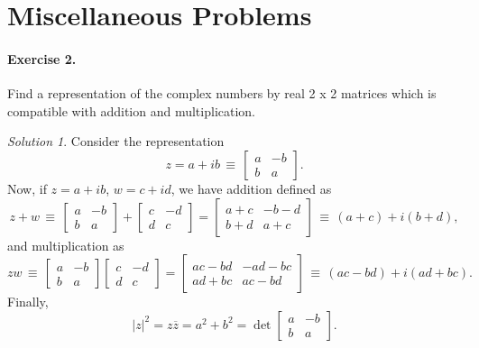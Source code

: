 \documentclass[11pt]{report}
\theoremstyle{remark}
\newtheorem*{solution}{Solution}
\begin{document}
    
    \section*{Miscellaneous Problems}

    \paragraph{Exercise 2.} Find a representation of the complex numbers by real 2 x
    2 matrices which is compatible with addition and multiplication.
    \begin{solution}
        Consider the representation \[
            z = a + ib \,\equiv\, \begin{bmatrix}
                a & -b \\ b & a
            \end{bmatrix}.
        \] Now, if $z = a + ib$, $w = c + id$, we have addition defined as \[
            z + w \,\equiv\, \begin{bmatrix}
                a & -b \\ b & a
            \end{bmatrix} + \begin{bmatrix}
                c & -d \\ d & c
            \end{bmatrix} = \begin{bmatrix}
                a + c & -b - d \\ b + d & a + c
            \end{bmatrix} \,\equiv\, (a + c) + i(b + d),
        \] and multiplication as \[
            zw \,\equiv\, \begin{bmatrix}
                a & -b \\ b & a
            \end{bmatrix} \begin{bmatrix}
                c & -d \\ d & c
            \end{bmatrix} = \begin{bmatrix}
                ac - bd & -ad - bc \\ ad + bc & ac - bd
            \end{bmatrix} \,\equiv\, (ac - bd) + i(ad + bc).
        \] Finally, \[
            |z|^2 = z\overline{z} = a^2 + b^2 = \det \begin{bmatrix}
                a & -b \\ b & a
            \end{bmatrix}.
        \] 
    \end{solution}
\end{document}
